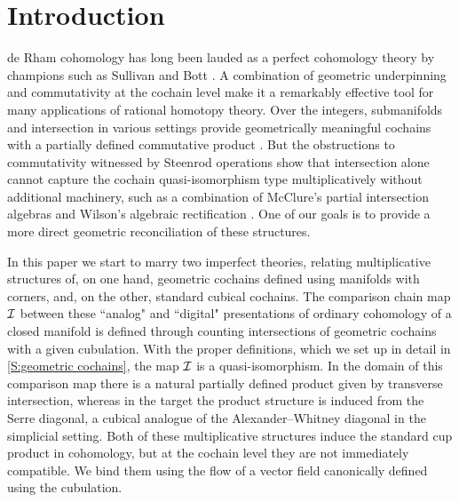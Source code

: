 
\section{Introduction}\label{S:intro}

de Rham cohomology has long been lauded as a perfect cohomology theory by champions such as Sullivan \cite{sullivan1977infinitesimal} and Bott \cite{BoTu82}.
A combination of geometric underpinning and commutativity at the cochain level make it a remarkably effective tool for many applications of rational homotopy theory.
Over the integers, submanifolds and intersection in various settings provide geometrically meaningful cochains \cite{Lipy14} with a partially defined commutative product \cite{Joyc15, medina2022foundations}.
But the obstructions to commutativity witnessed by Steenrod operations show that intersection alone cannot capture the cochain quasi-isomorphism type multiplicatively without additional machinery, such as a combination of McClure’s partial intersection algebras \cite{McCl06} and Wilson’s algebraic rectification \cite{Wils10}. One of our goals is to provide a more direct geometric reconciliation of these structures.

In this paper we start to marry two imperfect theories, relating multiplicative structures of, on one hand, geometric cochains defined using manifolds with corners, and, on the other, standard cubical cochains.
The comparison chain map $\mathcal{I}$ between these ``analog" and ``digital" presentations of ordinary cohomology of a closed manifold is defined through counting intersections of geometric cochains with a given cubulation. With the proper definitions, which we set up in detail in \cref{S:geometric cochains}, the map $\mathcal{I}$ is a quasi-isomorphism.
In the domain of this comparison map there is a natural partially defined product given by transverse intersection, whereas in the target the product structure is induced from the Serre diagonal, a cubical analogue of the Alexander--Whitney diagonal in the simplicial setting.
Both of these multiplicative structures induce the standard cup product in cohomology, but at the cochain level they are not immediately compatible.
We bind them using the flow of a vector field canonically defined using the cubulation.

